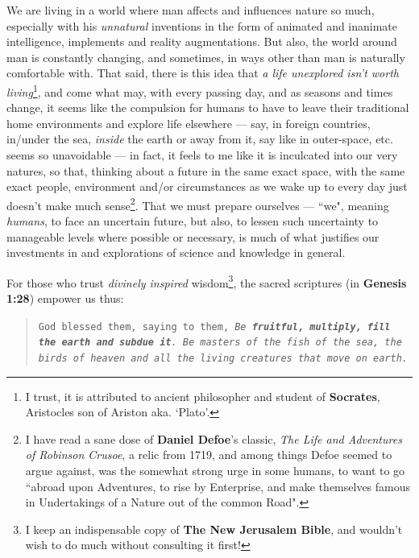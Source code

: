 \documentclass[a4paper, 18pt]{book} %
\begin{document}
We are living in a world where man affects and influences nature so much, especially with his \textit{unnatural} inventions in the form of animated and inanimate intelligence, implements and reality augmentations. But also, the world around man is constantly changing, and sometimes, in ways other than man is naturally comfortable with. That said, there is this idea that \textit{a life unexplored isn't worth living}\footnote{I trust, it is attributed to ancient philosopher and student of \textbf{Socrates}, Aristocles son of Ariston aka. `Plato'.}, and come what may, with every passing day, and as seasons and times change, it seems like the compulsion for humans to have to leave their traditional home environments and explore life elsewhere --- say, in foreign countries, in/under the sea, \textit{inside} the earth or away from it, say like in outer-space, etc. seems so unavoidable --- in fact, it feels to me like it is inculcated into our very natures, so that, thinking about a future in the same exact space, with the same exact people, environment and/or circumstances as we wake up to every day just doesn't make much sense\footnote{I have read a sane dose of \textbf{Daniel Defoe}'s classic, \textit{The Life and Adventures of Robinson Crusoe}, a relic from 1719, and among things Defoe seemed to argue against, was the somewhat strong urge in some humans, to want to go ``abroad upon Adventures, to rise by Enterprise, and make themselves famous in Undertakings of a Nature out of the common Road".}. That we must prepare ourselves --- ``we", meaning \textit{humans}, to face an uncertain future, but also, to lessen such uncertainty to manageable levels where possible or necessary, is much of what justifies our investments in and explorations of science and knowledge in general. 

For those who trust \textit{divinely inspired} wisdom\footnote{I keep an indispensable copy of \textbf{The New Jerusalem Bible}, and wouldn't wish to do much without consulting it first!}, the sacred scriptures (in \textbf{Genesis 1:28}) empower us thus:

\begin{quotation}
\noindent \texttt{God blessed them, saying to them, \textit{Be \textbf{fruitful, multiply, fill the earth and subdue it}. Be masters of the fish of the sea, the birds of heaven and all the living creatures that move on earth.}}\\
\end{quotation}
\end{document}
